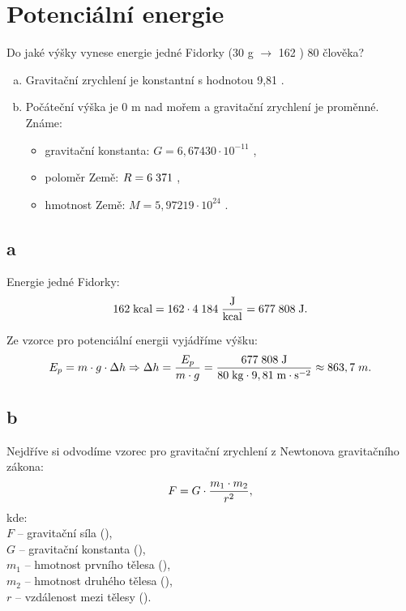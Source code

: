 \documentclass{article}
\begin{document}
\maketitle
\tableofcontents
\newpage




\section{ Potenciální energie \spicy}

Do jaké výšky vynese energie jedné Fidorky (30 g $\rightarrow$ 162 \ueqKCAL) 80 \ueqKG \fs člověka?

\begin{enumerate}[a)]
    \item Gravitační zrychlení je konstantní s hodnotou 9,81 \ueqMandSinvsq.
    \item Počáteční výška je 0 m nad mořem a gravitační zrychlení je proměnné. Známe:
          \begin{itemize}
              \item gravitační konstanta: $G = 6,67430 \cdot 10^{-11}$ \ueqNandMsqKGinvsq,
              \item poloměr Země: $R = 6 \; 371$ \ueqKM,
              \item hmotnost Země: $M = 5,97219 \cdot 10^{24}$ \ueqKG.
          \end{itemize}
\end{enumerate}



\subsection{a}

Energie jedné Fidorky:
$$
    162 \; \textrm{kcal} = 162 \cdot 4 \; 184 \; \frac{\textrm{J}}{\textrm{kcal}} = 677 \; 808 \; \textrm{J}.
$$

Ze vzorce pro potenciální energii vyjádříme výšku:
$$
    E_p = m \cdot g \cdot \Delta h \Rightarrow \Delta h = \frac{E_p}{m \cdot g} = \frac{677 \; 808 \; \textrm{J}}{80 \; \textrm{kg} \cdot 9,81 \; \textrm{m} \cdot \textrm{s}^{-2}} \approx 863,7 \; m.
$$



\subsection{b \spicy \spicy \spicy}

Nejdříve si odvodíme vzorec pro gravitační zrychlení z Newtonova gravitačního zákona:
\begin{equation}
    F = G \cdot \frac{m_1 \cdot m_2}{r^2},
    \unit{(\ueqN)}
\end{equation}
kde:\\
$F$ -- gravitační síla (\ueqN),\\
$G$ -- gravitační konstanta (\ueqNandMsqKGinvsq),\\
$m_1$ -- hmotnost prvního tělesa (\ueqKG),\\
$m_2$ -- hmotnost druhého tělesa (\ueqKG),\\
$r$ -- vzdálenost mezi tělesy (\ueqM).\\
\end{document}

